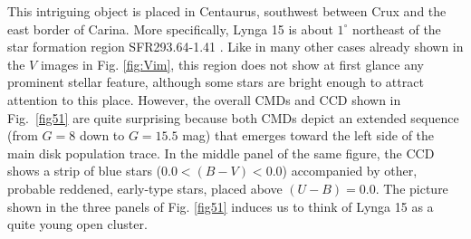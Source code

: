 \documentclass[draft]{aa}
\begin{document}
This intriguing object is placed in Centaurus, southwest between Crux and
the east border of Carina. More specifically, Lynga 15 is about $1^\circ$
northeast of the star formation region SFR293.64-1.41 \citep{Avedisova_2002}.
Like in many other cases already shown in the $V$ images in Fig. \ref{fig:Vim},
this region does not show at first glance any prominent stellar feature,
although some stars are bright enough to attract attention to this place.
%
However, the overall CMDs and CCD shown in Fig.~\ref{fig51}
are quite surprising because both CMDs depict an extended sequence (from $G=8$
down to $G=15.5$ mag) that emerges toward the left side of the main disk population
trace. In the middle panel of the same figure, the CCD shows a strip of blue stars
($0.0<(B-V)<0.0$) accompanied by other, probable reddened, early-type stars,
placed above $(U-B) = 0.0$. The picture shown in the three panels of Fig.
\ref{fig51} induces us to think of Lynga 15 as a quite young open cluster.\\
\end{document}
